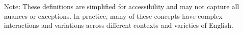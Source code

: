 



Note: These definitions are simplified for accessibility and may not capture all nuances or exceptions. In practice, many of these concepts have complex interactions and variations across different contexts and varieties of English.
